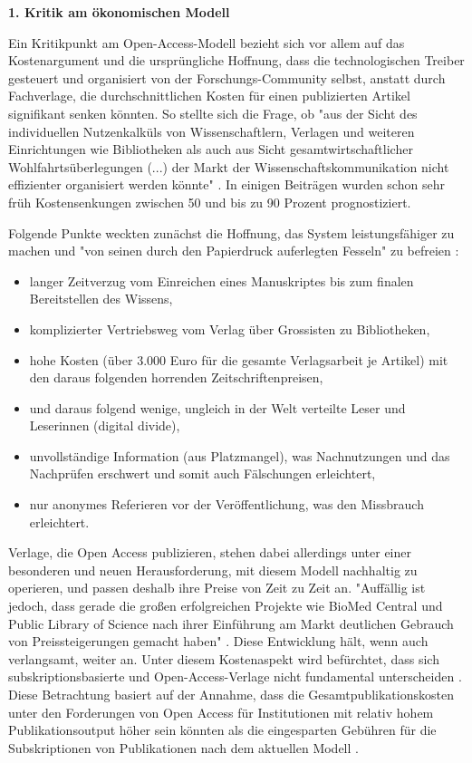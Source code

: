 \textbf{1. Kritik am ökonomischen Modell}

Ein Kritikpunkt am Open-Access-Modell bezieht sich vor allem auf das Kostenargument und die ursprüngliche Hoffnung, dass die technologischen Treiber gesteuert und organisiert von der Forschungs-Community selbst, anstatt durch Fachverlage, die durchschnittlichen Kosten für einen publizierten Artikel signifikant senken könnten. So stellte sich die Frage, ob "aus der Sicht des individuellen Nutzenkalküls von Wissenschaftlern, Verlagen und weiteren Einrichtungen wie Bibliotheken als auch aus Sicht gesamtwirtschaftlicher Wohlfahrtsüberlegungen (...) der Markt der Wissenschaftskommunikation nicht effizienter organisiert werden könnte" \cite{Hess_2006}. In einigen Beiträgen wurden schon sehr früh Kostensenkungen zwischen 50 und bis zu 90 Prozent \cite{Hilf_2004} \cite[:64]{Willinsky_2006} prognostiziert.

Folgende Punkte weckten zunächst die Hoffnung, das System leistungsfähiger zu machen und "von seinen durch den Papierdruck auferlegten Fesseln" zu befreien \cite{Hilf_2004}:
\begin{itemize}
\item langer Zeitverzug vom Einreichen eines Manuskriptes bis zum finalen Bereitstellen des Wissens,
\item komplizierter Vertriebsweg vom Verlag über Grossisten zu Bibliotheken,
\item hohe Kosten (über 3.000 Euro für die gesamte Verlagsarbeit je Artikel) mit den daraus folgenden horrenden Zeitschriftenpreisen,
\item und daraus folgend wenige, ungleich in der Welt verteilte Leser und Leserinnen (digital divide),
\item unvollständige Information (aus Platzmangel), was Nachnutzungen und das Nachprüfen erschwert und somit auch Fälschungen erleichtert,
\item nur anonymes Referieren vor der Veröffentlichung, was den Missbrauch erleichtert.
\end{itemize}

Verlage, die Open Access publizieren, stehen dabei allerdings unter einer besonderen und neuen Herausforderung, mit diesem Modell nachhaltig zu operieren, und passen deshalb ihre Preise von Zeit zu Zeit an. "Auffällig ist jedoch, dass gerade die großen erfolgreichen Projekte wie BioMed Central und Public Library of Science nach ihrer Einführung am Markt deutlichen Gebrauch von Preissteigerungen gemacht haben" \cite{Schmidt_2007}. Diese Entwicklung hält, wenn auch verlangsamt, weiter an. Unter diesem Kostenaspekt wird befürchtet, dass sich subskriptionsbasierte und Open-Access-Verlage nicht fundamental unterscheiden \cite{Schmidt_2007}. Diese Betrachtung basiert auf der Annahme, dass die Gesamtpublikationskosten unter den Forderungen von Open Access für Institutionen mit relativ hohem Publikationsoutput höher sein könnten als die eingesparten Gebühren für die Subskriptionen von Publikationen nach dem aktuellen Modell \cite{Mueller-Langer_2010}.

